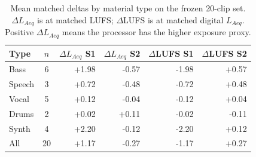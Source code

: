 \begin{table}[!htbp]
\centering
\caption{Mean matched deltas by material type on the frozen 20-clip set. $\Delta L_{Aeq}$ is at matched LUFS; $\Delta$LUFS is at matched digital $L_{Aeq}$. Positive $\Delta L_{Aeq}$ means the processor has the higher exposure proxy.}
\label{tab:genre}
\renewcommand{\arraystretch}{1.12}
\begin{tabular}{l c r r r r}
\hline
Type & $n$ & $\Delta L_{Aeq}$ S1 & $\Delta L_{Aeq}$ S2 & $\Delta$LUFS S1 & $\Delta$LUFS S2 \\
\hline
Bass & 6 & +1.98 & -0.57 & -1.98 & +0.57 \\
Speech & 3 & +0.72 & -0.48 & -0.72 & +0.48 \\
Vocal & 5 & +0.12 & -0.04 & -0.12 & +0.04 \\
Drums & 2 & +0.02 & +0.11 & -0.02 & -0.11 \\
Synth & 4 & +2.20 & -0.12 & -2.20 & +0.12 \\
\hline
All & 20 & +1.17 & -0.27 & -1.17 & +0.27 \\
\hline
\end{tabular}
\end{table}
